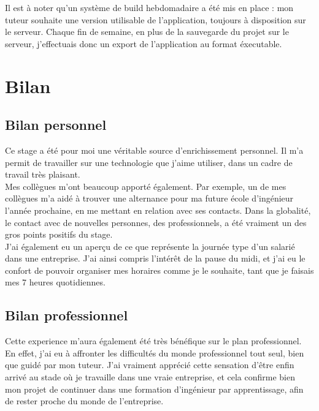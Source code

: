 \documentclass[a4paper]{article}
\begin{document}
    Il est à noter qu'un système de build hebdomadaire a été mis en place : mon tuteur souhaite une version utilisable de l'application, toujours à disposition sur le serveur. Chaque fin de semaine, en plus de la sauvegarde du projet sur le serveur, j'effectuais donc un export de l'application au format éxecutable. \\
    
    \section{Bilan}
    
    \subsection{Bilan personnel}

        Ce stage a été pour moi une véritable source d'enrichissement personnel. Il m'a permit de travailler sur une technologie que j'aime utiliser, dans un cadre de travail très plaisant. \\

        Mes collègues m'ont beaucoup apporté également. Par exemple, un de mes collègues m'a aidé à trouver une alternance pour ma future école d'ingénieur l'année prochaine, en me mettant en relation avec ses contacts. Dans la globalité, le contact avec de nouvelles personnes, des professionnels, a été vraiment un des gros points positifs du stage. \\

        J'ai également eu un aperçu de ce que représente la journée type d'un salarié dans une entreprise. J'ai ainsi compris l'intérêt de la pause du midi, et j'ai eu le confort de pouvoir organiser mes horaires comme je le souhaite, tant que je faisais mes 7 heures quotidiennes. \\

    \subsection{Bilan professionnel}

    Cette experience m'aura également été très bénéfique sur le plan professionnel. En effet, j'ai eu à affronter les difficultés du monde professionnel tout seul, bien que guidé par mon tuteur. J'ai vraiment apprécié cette sensation d'être enfin arrivé au stade où je travaille dans une vraie entreprise, et cela confirme bien mon projet de continuer dans une formation d'ingénieur par apprentissage, afin de rester proche du monde de l'entreprise. \\
\end{document}
